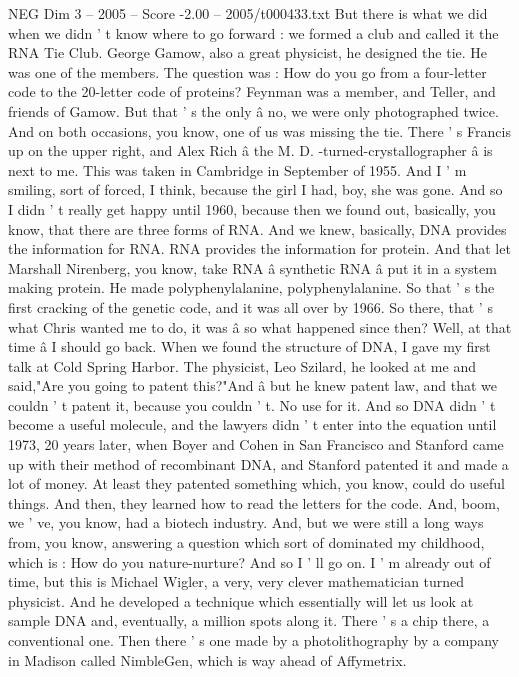 \begin{textsample}{NEG Dim 3 – 2005 – Score -2.00 – 2005/t000433.txt}
But there is what we did when we didn ' t know where to go forward : we formed a club and called it the RNA Tie Club.
George Gamow, also a great physicist, he designed the tie.
He was one of the members.
The question was : How do you go from a four-letter code to the 20-letter code of proteins?
Feynman was a member, and Teller, and friends of Gamow.
But that ' s the only â no, we were only photographed twice.
And on both occasions, you know, one of us was missing the tie.
There ' s Francis up on the upper right, and Alex Rich â the M.
D. -turned-crystallographer â is next to me.
This was taken in Cambridge in September of 1955.
And I ' m smiling, sort of forced, I think, because the girl I had, boy, she was gone.
And so I didn ' t really get happy until 1960, because then we found out, basically, you know, that there are three forms of RNA.
And we knew, basically, DNA provides the information for RNA.
RNA provides the information for protein.
And that let Marshall Nirenberg, you know, take RNA â synthetic RNA â put it in a system making protein.
He made polyphenylalanine, polyphenylalanine.
So that ' s the first cracking of the genetic code, and it was all over by 1966.
So there, that ' s what Chris wanted me to do, it was â so what happened since then?
Well, at that time â I should go back.
When we found the structure of DNA, I gave my first talk at Cold Spring Harbor.
The physicist, Leo Szilard, he looked at me and said,"Are you going to patent this?"And â but he knew patent law, and that we couldn ' t patent it, because you couldn ' t.
No use for it.
And so DNA didn ' t become a useful molecule, and the lawyers didn ' t enter into the equation until 1973, 20 years later, when Boyer and Cohen in San Francisco and Stanford came up with their method of recombinant DNA, and Stanford patented it and made a lot of money.
At least they patented something which, you know, could do useful things.
And then, they learned how to read the letters for the code.
And, boom, we ' ve, you know, had a biotech industry.
And, but we were still a long ways from, you know, answering a question which sort of dominated my childhood, which is : How do you nature-nurture?
And so I ' ll go on.
I ' m already out of time, but this is Michael Wigler, a very, very clever mathematician turned physicist.
And he developed a technique which essentially will let us look at sample DNA and, eventually, a million spots along it.
There ' s a chip there, a conventional one.
Then there ' s one made by a photolithography by a company in Madison called NimbleGen, which is way ahead of Affymetrix.

\end{textsample}
